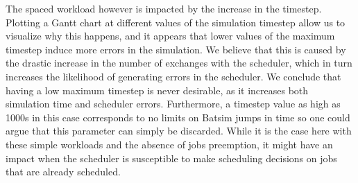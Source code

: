 The spaced workload however is impacted by the increase in the timestep.
Plotting a Gantt chart at different values of the simulation timestep allow us
to visualize why this happens, and it appears that lower values of the maximum
timestep induce more errors in the simulation. We believe that this is caused
by the drastic increase in the number of exchanges with the scheduler, which in
turn increases the likelihood of generating errors in the scheduler. We
conclude that having a low maximum timestep is never desirable, as it increases
both simulation time and scheduler errors. Furthermore, a timestep value as
high as 1000s in this case corresponds to no limits on Batsim jumps in time so
one could argue that this parameter can simply be discarded. While it is the
case here with these simple workloads and the absence of jobs preemption, it
might have an impact when the scheduler is susceptible to make scheduling
decisions on jobs that are already scheduled.

%
%
%
%
%
%
